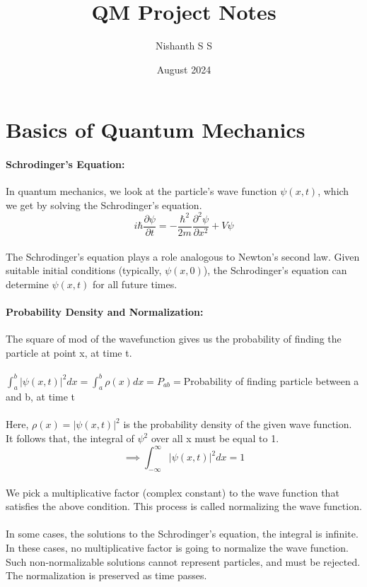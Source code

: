 \documentclass[12pt]{article}
\title{QM Project Notes}
\author{Nishanth S S}
\date{August 2024}
\begin{document}
\maketitle

\section{Basics of Quantum Mechanics}

\paragraph{Schrodinger's Equation:}

In quantum mechanics, we look at the particle's wave function $\psi(x,t)$, which we get by solving the Schrodinger's equation. 
\[  i \hbar \frac{\partial \psi}{\partial t} = - \frac{\hbar^2}{2m} \frac{\partial^2 \psi }{\partial x^2} + V \psi\]
\\
The Schrodinger's equation plays a role analogous to Newton's second law. Given suitable initial conditions 
(typically, $\psi(x,0)$), the Schrodinger's equation can determine $\psi(x,t)$ for all future times. 
\\
\paragraph{Probability Density and Normalization:}

The square of mod of the wavefunction gives us the probability of finding the particle at point x, at time t.
\\
\\
$ \int_a^b |\psi(x,t)|^2 dx = \int_a^b \rho (x) dx = P_{ab} = $Probability of finding particle between a and b, at time t
\\
\\
Here, $\rho(x) = |\psi(x,t)|^2 $ is the probability density of the given wave function. It follows that, the integral 
of $\psi^2$ over all x must be equal to 1. 
\[ \implies \int_{-\infty}^{\infty} |\psi(x,t)|^2 dx = 1\]
\\
We pick a multiplicative factor (complex constant) to the wave function that satisfies the above condition. This process 
is called normalizing the wave function.
\\
\\
In some cases, the solutions to the Schrodinger's equation, the integral is infinite. In these cases, no multiplicative 
factor is going to normalize the wave function. Such non-normalizable solutions cannot represent particles, and must be 
rejected. The normalization is preserved as time passes.  
\end{document}
